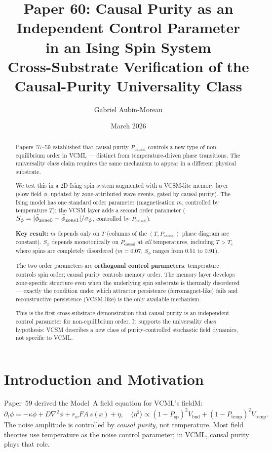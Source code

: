 \documentclass[11pt,a4paper]{article}
\title{\textbf{Paper 60: Causal Purity as an Independent Control Parameter\\
in an Ising Spin System}\\
\large Cross-Substrate Verification of the Causal-Purity Universality Class}
\author[1]{Gabriel Aubin-Moreau}
\affil[1]{Independent research}
\date{March 2026}
\begin{document}
\maketitle

\begin{abstract}
Papers~57--59 established that causal purity $P_\mathrm{causal}$ controls a new
type of non-equilibrium order in VCML --- distinct from temperature-driven phase
transitions.
The universality class claim requires the same mechanism to appear in a different
physical substrate.

We test this in a 2D Ising spin system augmented with a VCSM-lite memory layer
(slow field $\phi$, updated by zone-attributed wave events, gated by causal purity).
The Ising model has one standard order parameter (magnetisation $m$, controlled
by temperature $T$); the VCSM layer adds a second order parameter
($S_\phi = |\bar\phi_{\rm zone0} - \bar\phi_{\rm zone1}|/\sigma_\phi$,
controlled by $P_\mathrm{causal}$).

\textbf{Key result:} $m$ depends only on $T$
(columns of the $(T, P_\mathrm{causal})$ phase diagram are constant).
$S_\phi$ depends monotonically on $P_\mathrm{causal}$ at \emph{all}
temperatures, including $T > T_c$ where spins are completely disordered
($m = 0.07$, $S_\phi$ ranges from $0.51$ to $0.91$).

The two order parameters are \textbf{orthogonal control parameters}:
temperature controls spin order; causal purity controls memory order.
The memory layer develops zone-specific structure even when the
underlying spin substrate is thermally disordered --- exactly the
condition under which attractor persistence (ferromagnet-like)
fails and reconstructive persistence (VCSM-like) is the only available mechanism.

This is the first cross-substrate demonstration that causal purity is an
independent control parameter for non-equilibrium order.
It supports the universality class hypothesis: VCSM describes a new class
of purity-controlled stochastic field dynamics, not specific to VCML.
\end{abstract}

\section{Introduction and Motivation}

Paper~59 derived the Model~A field equation for VCML's fieldM:
\begin{equation}
  \partial_t\phi = -\kappa\phi + D\nabla^2\phi + r_w FA\,s(x) + \eta,
  \quad
  \langle\eta^2\rangle \propto (1-P_\mathrm{sp})^2 V_\mathrm{bnd}
  + (1-P_\mathrm{temp})^2 V_\mathrm{temp}.
\end{equation}
The noise amplitude is controlled by \emph{causal purity}, not temperature.
Most field theories use temperature as the noise control parameter;
in VCML, causal purity plays that role.
\end{document}
